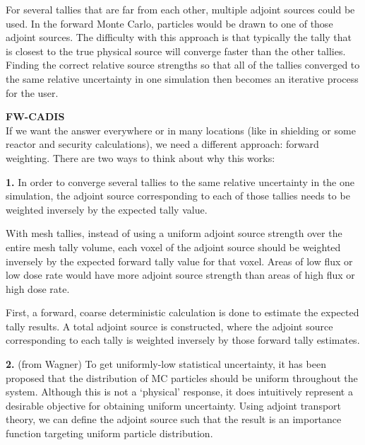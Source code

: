 \documentclass[12pt]{article}
\begin{document}
For several tallies that are far from each other, multiple adjoint sources
could be used. In the forward Monte Carlo, particles would be drawn to one of
those adjoint sources. The difficulty with this approach is that typically the
tally that is closest to the true physical source will converge faster than the
other tallies. Finding the correct relative source strengths so that all of the
tallies converged to the same relative uncertainty in one simulation then
becomes an iterative process for the user.

\textbf{FW-CADIS}\\
If we want the answer everywhere or in many locations (like in shielding or
some reactor and security calculations), we need a different approach: forward
weighting. There are two ways to think about why this works:

\textbf{1.} In order to converge several tallies to the same relative uncertainty in the
one simulation, the adjoint source corresponding to each of those tallies needs
to be weighted inversely by the expected tally value.

With mesh tallies, instead of using a uniform adjoint source strength over the
entire mesh tally volume, each voxel of the adjoint source should be weighted
inversely by the expected forward tally value for that voxel. Areas of low flux
or low dose rate would have more adjoint source strength than areas of high flux or high dose rate.

First, a forward, coarse deterministic calculation is done to estimate the
expected tally results.
A total adjoint source is constructed, where the adjoint source corresponding
to each tally is weighted inversely by those forward tally estimates.

\textbf{2.} (from Wagner) To get uniformly-low statistical uncertainty, it has
been proposed that the distribution of MC particles should be uniform throughout the system.
Although this is not a `physical' response, it does intuitively represent a
desirable objective for obtaining uniform uncertainty.
Using adjoint transport theory, we can define the adjoint source such that the
result is an importance function targeting uniform particle distribution.
\end{document}
